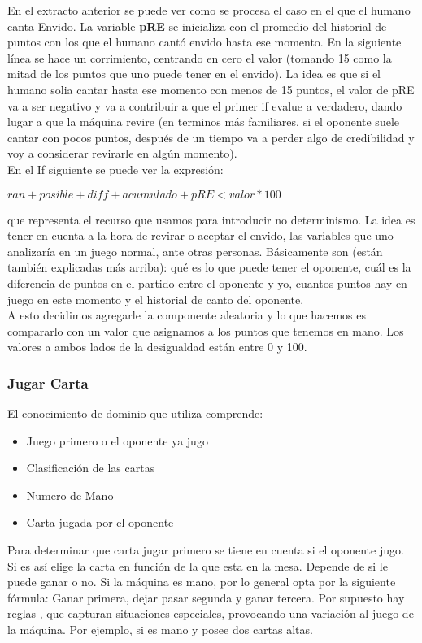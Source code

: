 \documentclass[12pt,a4paper]{article}
\begin{document}
\noindent En el extracto anterior se puede ver como se procesa el caso en el que el humano canta Envido.
La variable \textbf{pRE} se inicializa con el promedio del historial de puntos con los que el humano
cant\'o envido hasta ese momento. En la siguiente l\'inea se hace un corrimiento, centrando en cero el valor
(tomando 15 como la mitad de los puntos que uno puede tener en el envido). La idea es que si el humano
solia cantar hasta ese momento con menos de 15 puntos, el valor de pRE va a ser negativo y va a contribuir
a que el primer if evalue a verdadero, dando lugar a que la m\'aquina revire (en terminos m\'as familiares,
si el oponente suele cantar con pocos puntos, despu\'es de un tiempo va a perder algo de credibilidad y voy 
a considerar revirarle en alg\'un momento).\\
\noindent En el If siguiente se puede ver la expresi\'on: 
\begin{center}
	$ ran + posible + diff + acumulado + pRE  <  valor  * 100 $
\end{center}
que representa el recurso que usamos para introducir no determinismo. La idea es tener en cuenta a la hora de revirar
o aceptar el envido, las variables que uno analizar\'ia en un juego normal, ante otras personas. B\'asicamente son 
(est\'an tambi\'en explicadas m\'as arriba): qu\'e es lo que puede tener el oponente, cu\'al es la diferencia de puntos
en el partido entre el oponente y yo, cuantos puntos hay en juego en este momento y el historial de canto del oponente.\\
\noindent A esto decidimos agregarle la componente aleatoria y lo que hacemos es compararlo con un valor que asignamos a
los puntos que tenemos en mano. Los valores a ambos lados de la desigualdad est\'an entre 0 y 100.



\subsubsection{Jugar Carta}
El conocimiento de dominio que utiliza comprende:
\begin{itemize}
\item Juego primero o  el oponente ya jugo
\item Clasificaci\'on de las cartas
\item Numero de Mano
\item Carta jugada por el oponente
\end{itemize}

Para determinar que carta jugar primero se tiene en cuenta si el oponente jugo. Si es as\'i elige la carta en 
funci\'on de la que esta en la mesa. Depende de si le puede ganar o no.
Si la m\'aquina es mano, por lo general opta por la siguiente f\'ormula: Ganar primera, dejar pasar segunda y ganar tercera. 
Por supuesto hay reglas , que capturan situaciones especiales, provocando una variaci\'on al juego de la m\'aquina. Por ejemplo, si es mano y posee dos cartas altas.
\end{document}
